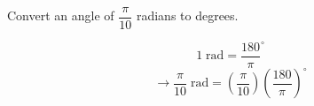 \question Convert an angle of $\dfrac{\pi}{10}$ radians to degrees.
\begin{solution}
	\[
		1 \; \text{rad} = \frac{180}{\pi}^{\circ}
	\]
	\[
		\rightarrow
		\frac{\pi}{10} \; \text{rad} 
		=
		\left( \frac{\pi}{10} \right) \left( \frac{180}{\pi} \right)^{\circ}
	\]
\end{solution}

